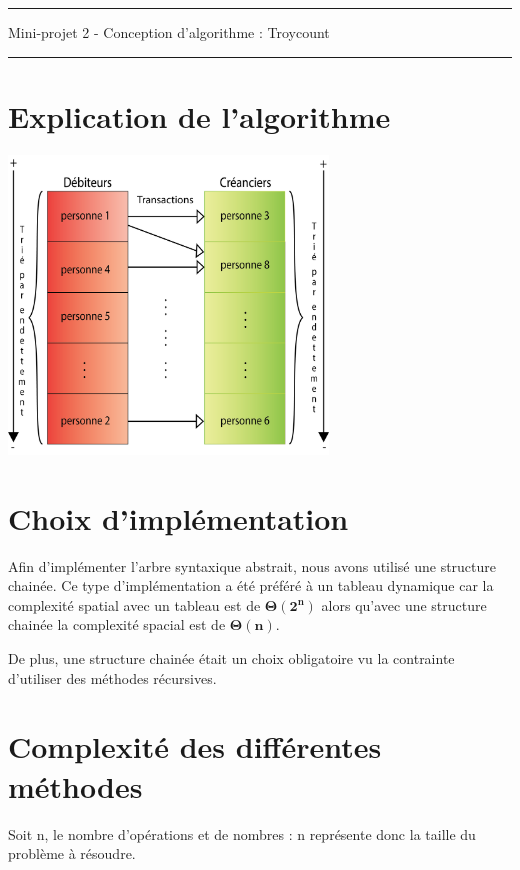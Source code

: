 \documentclass[12pt, a4paper, table]{article}
\begin{document}
\begin{Large} \begin{center}
\noindent \rule{15cm}{.9pt} 
\vspace{-0.33cm}
	\textsf{Mini-projet 2 -  Conception d’algorithme : Troycount}\\
	\rule{15cm}{.9pt} 
\end{center} \end{Large} 

\section{Explication de l'algorithme}
\begin{center}
\vspace{1cm}
	\includegraphics[width = 8.5cm]{sch}
\end{center}

\newpage

\selectfont
\section{Choix d'implémentation}
Afin d'implémenter l'arbre syntaxique abstrait, nous avons utilisé une structure chainée. Ce type d'implémentation a été préféré à un tableau dynamique car la complexité spatial avec un tableau est de $\mathbf{\Theta (2^{n})}$ alors qu'avec une structure chainée la complexité spacial est de $\mathbf{\Theta (n)}$.
\medskip

De plus, une structure chainée était un choix obligatoire vu la contrainte d'utiliser des méthodes récursives.
\vspace{-6pt}
\section{Complexité des différentes méthodes}
\noindent Soit n, le nombre d'opérations et de nombres : n représente donc la taille du problème à résoudre.
\vspace{-6pt}
\end{document}
